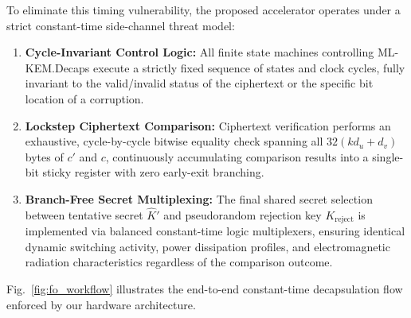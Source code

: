 To eliminate this timing vulnerability, the proposed accelerator operates under a strict constant-time side-channel threat model:
\begin{enumerate}
    \item \textbf{Cycle-Invariant Control Logic:} All finite state machines controlling \mbox{ML-KEM.Decaps} execute a strictly fixed sequence of states and clock cycles, fully invariant to the valid/invalid status of the ciphertext or the specific bit location of a corruption.
    \item \textbf{Lockstep Ciphertext Comparison:} Ciphertext verification performs an exhaustive, cycle-by-cycle bitwise equality check spanning all $32(kd_u + d_v)$ bytes of $c'$ and $c$, continuously accumulating comparison results into a single-bit sticky register with zero early-exit branching.
    \item \textbf{Branch-Free Secret Multiplexing:} The final shared secret selection between tentative secret $\hat{K}'$ and pseudorandom rejection key $K_{\text{reject}}$ is implemented via balanced constant-time logic multiplexers, ensuring identical dynamic switching activity, power dissipation profiles, and electromagnetic radiation characteristics regardless of the comparison outcome.
\end{enumerate}
Fig.~\ref{fig:fo_workflow} illustrates the end-to-end constant-time decapsulation flow enforced by our hardware architecture.
